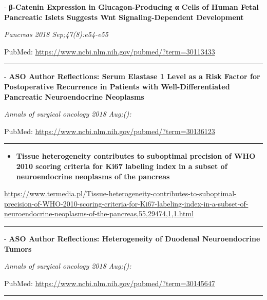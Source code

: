 \documentclass[]{article}
\providecommand{\tightlist}{%
  \setlength{\itemsep}{0pt}\setlength{\parskip}{0pt}}
\begin{document}
 - \textbf{β-Catenin Expression in Glucagon-Producing α Cells of Human
Fetal Pancreatic Islets Suggests Wnt Signaling-Dependent Development}

\emph{Pancreas 2018 Sep;47(8):e54-e55}

PubMed: \url{https://www.ncbi.nlm.nih.gov/pubmed/?term=30113433}

{}

{}

\begin{center}\rule{0.5\linewidth}{\linethickness}\end{center}

 - \textbf{ASO Author Reflections: Serum Elastase 1 Level as a Risk
Factor for Postoperative Recurrence in Patients with Well-Differentiated
Pancreatic Neuroendocrine Neoplasms}

\emph{Annals of surgical oncology 2018 Aug;():}

PubMed: \url{https://www.ncbi.nlm.nih.gov/pubmed/?term=30136123}

{}

{}

\begin{center}\rule{0.5\linewidth}{\linethickness}\end{center}

\begin{itemize}
\tightlist
\item
  \textbf{Tissue heterogeneity contributes to suboptimal precision of
  WHO 2010 scoring criteria for Ki67 labeling index in a subset of
  neuroendocrine neoplasms of the pancreas}
\end{itemize}

\url{https://www.termedia.pl/Tissue-heterogeneity-contributes-to-suboptimal-precision-of-WHO-2010-scoring-criteria-for-Ki67-labeling-index-in-a-subset-of-neuroendocrine-neoplasms-of-the-pancreas,55,29474,1,1.html}

\begin{center}\rule{0.5\linewidth}{\linethickness}\end{center}

 - \textbf{ASO Author Reflections: Heterogeneity of Duodenal
Neuroendocrine Tumors}

\emph{Annals of surgical oncology 2018 Aug;():}

PubMed: \url{https://www.ncbi.nlm.nih.gov/pubmed/?term=30145647}

{}

{}

\begin{center}\rule{0.5\linewidth}{\linethickness}\end{center}
\end{document}
